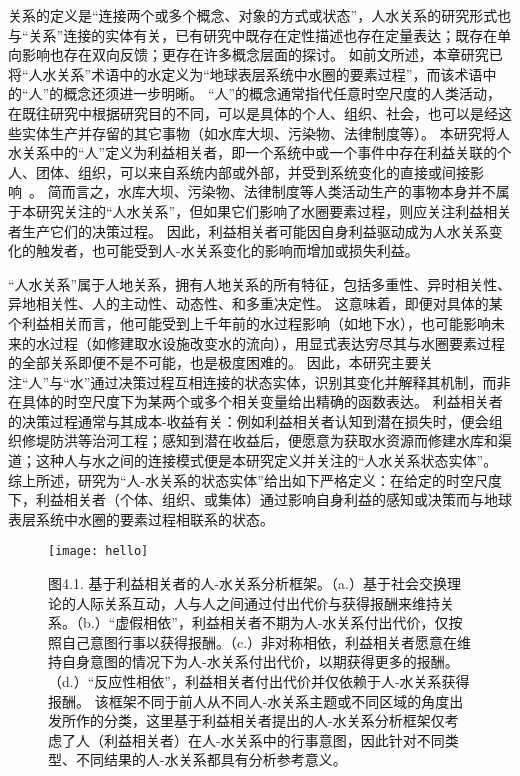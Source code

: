 
关系的定义是“连接两个或多个概念、对象的方式或状态”，人水关系的研究形式也与“关系”连接的实体有关，已有研究中既存在定性描述也存在定量表达；既存在单向影响也存在双向反馈；更存在许多概念层面的探讨。
如前文所述，本章研究已将“人水关系”术语中的水定义为“地球表层系统中水圈的要素过程”，而该术语中的“人”的概念还须进一步明晰。
“人”的概念通常指代任意时空尺度的人类活动，在既往研究中根据研究目的不同，可以是具体的个人、组织、社会，也可以是经这些实体生产并存留的其它事物（如水库大坝、污染物、法律制度等）。
本研究将人水关系中的“人”定义为利益相关者，即一个系统中或一个事件中存在利益关联的个人、团体、组织，可以来自系统内部或外部，并受到系统变化的直接或间接影响~\cite{bonnafous-boucher2016}。
简而言之，水库大坝、污染物、法律制度等人类活动生产的事物本身并不属于本研究关注的“人水关系”，但如果它们影响了水圈要素过程，则应关注利益相关者生产它们的决策过程。
因此，利益相关者可能因自身利益驱动成为人水关系变化的触发者，也可能受到人-水关系变化的影响而增加或损失利益。

“人水关系”属于人地关系，拥有人地关系的所有特征，包括多重性、异时相关性、异地相关性、人的主动性、动态性、和多重决定性\cite{fang2004}。
这意味着，即便对具体的某个利益相关而言，他可能受到上千年前的水过程影响（如地下水），也可能影响未来的水过程（如修建取水设施改变水的流向），用显式表达穷尽其与水圈要素过程的全部关系即便不是不可能，也是极度困难的。
因此，本研究主要关注“人”与“水”通过决策过程互相连接的状态实体，识别其变化并解释其机制，而非在具体的时空尺度下为某两个或多个相关变量给出精确的函数表达。
利益相关者的决策过程通常与其成本-收益有关：例如利益相关者认知到潜在损失时，便会组织修堤防洪等治河工程；感知到潜在收益后，便愿意为获取水资源而修建水库和渠道；这种人与水之间的连接模式便是本研究定义并关注的“人水关系状态实体”。
综上所述，研究为“人-水关系的状态实体”给出如下严格定义：在给定的时空尺度下，利益相关者（个体、组织、或集体）通过影响自身利益的感知或决策而与地球表层系统中水圈的要素过程相联系的状态。

\begin{figure}[htb] %
    \centering
    \texttt{[image: hello]}
    \caption[基于利益相关者的人-水关系分析框架]{图4.1. 基于利益相关者的人-水关系分析框架。（a.）基于社会交换理论的人际关系互动，人与人之间通过付出代价与获得报酬来维持关系。（b.）“虚假相依”，利益相关者不期为人-水关系付出代价，仅按照自己意图行事以获得报酬。（c.）非对称相依，利益相关者愿意在维持自身意图的情况下为人-水关系付出代价，以期获得更多的报酬。（d.）“反应性相依”，利益相关者付出代价并仅依赖于人-水关系获得报酬。
    该框架不同于前人从不同人-水关系主题或不同区域的角度出发所作的分类，这里基于利益相关者提出的人-水关系分析框架仅考虑了人（利益相关者）在人-水关系中的行事意图，因此针对不同类型、不同结果的人-水关系都具有分析参考意义。}\label{ch2:fig:reaction}
\end{figure}

